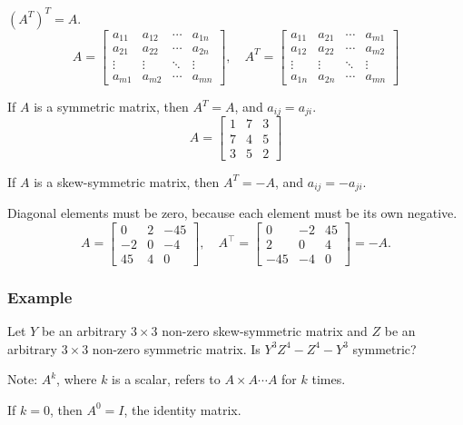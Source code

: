 \documentclass[../linear-algebra.tex]{subfiles}
\begin{document}
\noindent $(A^T)^T = A$.
\[
A = \begin{bmatrix}
a_{11} & a_{12} & \cdots & a_{1n} \\
a_{21} & a_{22} & \cdots & a_{2n} \\
\vdots & \vdots & \ddots & \vdots \\
a_{m1} & a_{m2} & \cdots & a_{mn}
\end{bmatrix}, \quad
A^T = \begin{bmatrix}
a_{11} & a_{21} & \cdots & a_{m1} \\
a_{12} & a_{22} & \cdots & a_{m2} \\
\vdots & \vdots & \ddots & \vdots \\
a_{1n} & a_{2n} & \cdots & a_{mn}
\end{bmatrix}
\]

\noindent If $A$ is a symmetric matrix, then $A^T = A$, and $a_{ij} = a_{ji}$.
\[
A = \begin{bmatrix}
1 & 7 & 3 \\
7 & 4 & 5 \\
3 & 5 & 2
\end{bmatrix}
\]

\noindent If $A$ is a skew-symmetric matrix, then $A^T = -A$, and $a_{ij} = -a_{ji}$.

\noindent Diagonal elements must be zero, because each element must be its own negative.
\[
A = \begin{bmatrix}
0 & 2 & -45 \\
-2 & 0 & -4 \\
45 & 4 & 0
\end{bmatrix}, \quad
A^\top = \begin{bmatrix}
0 & -2 & 45 \\
2 & 0 & 4 \\
-45 & -4 & 0
\end{bmatrix} = -A.
\]

\subsubsection{Example}
Let $Y$ be an arbitrary $3\times3$ non-zero skew-symmetric matrix and $Z$ be
an arbitrary $3\times3$ non-zero symmetric matrix. Is $Y^3Z^4-Z^4-Y^3$ symmetric?

\noindent Note: $A^k$, where $k$ is a scalar, refers to $A\times A \cdots A$ for $k$ times.

\noindent If $k=0$, then $A^0 = I$, the identity matrix.

\bigskip
\end{document}
